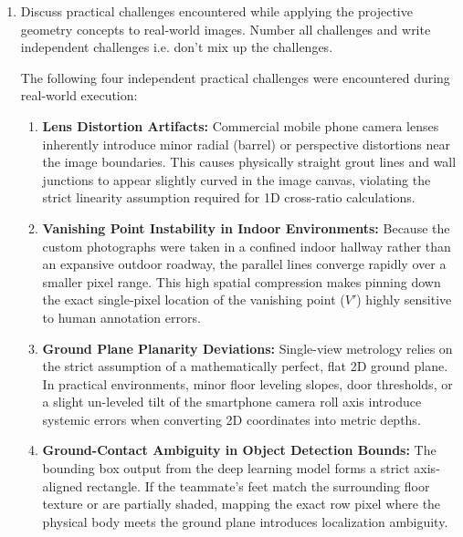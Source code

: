 \begin{enumerate}
\begin{studentSpace}
First, a physical baseline reference was established by using a tape measure to find the exact distance from the camera setup position to the base of the wooden door frame ($C$), yielding a ground truth distance of $Z_C = 3.0$ meters. By processing the first-person image through our projective geometry backend, the cross-ratio formula resolves the absolute distance from the camera to the teammate ($Z_B$) to be $2.6$ meters. 

To fulfill the task requirement of estimating the distance between the object of interest (the door frame) and the teammate, we compute the absolute interval:
$$ \text{Distance} = |Z_C - Z_B| = |3.0\text{m} - 2.6\text{m}| = \mathbf{0.4\text{ meters}} $$
\end{studentSpace}

  
\item Discuss practical challenges encountered while applying the projective geometry concepts to real-world images. Number all challenges and write independent challenges i.e. don't mix up the challenges.

\begin{studentSpace}
The following four independent practical challenges were encountered during real-world execution:
\begin{enumerate}
    \item \textbf{Lens Distortion Artifacts:} Commercial mobile phone camera lenses inherently introduce minor radial (barrel) or perspective distortions near the image boundaries. This causes physically straight grout lines and wall junctions to appear slightly curved in the image canvas, violating the strict linearity assumption required for 1D cross-ratio calculations.
    \item \textbf{Vanishing Point Instability in Indoor Environments:} Because the custom photographs were taken in a confined indoor hallway rather than an expansive outdoor roadway, the parallel lines converge rapidly over a smaller pixel range. This high spatial compression makes pinning down the exact single-pixel location of the vanishing point ($V'$) highly sensitive to human annotation errors.
    \item \textbf{Ground Plane Planarity Deviations:} Single-view metrology relies on the strict assumption of a mathematically perfect, flat 2D ground plane. In practical environments, minor floor leveling slopes, door thresholds, or a slight un-leveled tilt of the smartphone camera roll axis introduce systemic errors when converting 2D coordinates into metric depths.
    \item \textbf{Ground-Contact Ambiguity in Object Detection Bounds:} The bounding box output from the deep learning model forms a strict axis-aligned rectangle. If the teammate's feet match the surrounding floor texture or are partially shaded, mapping the exact row pixel where the physical body meets the ground plane introduces localization ambiguity.
\end{enumerate}
\end{studentSpace}


\end{enumerate}
